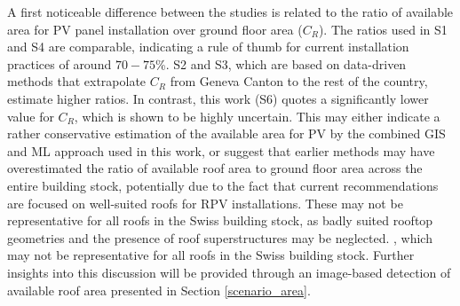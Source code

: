 A first noticeable difference between the studies is related to the ratio of available area for PV panel installation over ground floor area ($C_R$). The ratios used in S1 and S4 are comparable, indicating a rule of thumb for current installation practices of around $70 - 75$\%. S2 and S3, which are based on data-driven methods that extrapolate $C_R$ from Geneva Canton to the rest of the country, estimate higher ratios. 
In contrast, this work (S6) quotes a significantly lower value for $C_R$, which is shown to be highly uncertain.
This may either indicate a rather conservative estimation of the available area for PV by the combined GIS and ML approach used in this work, or suggest that earlier methods may have overestimated the ratio of available roof area to ground floor area across the entire building stock, potentially due to the fact that current recommendations are focused on well-suited roofs for RPV installations. 
These may not be representative for all roofs in the Swiss building stock, as badly suited rooftop geometries and the presence of roof superstructures may be neglected. 
, which may not be representative for all roofs in the Swiss building stock. 
Further insights into this discussion will be provided through an image-based detection of available roof area presented in Section \ref{scenario_area}.

